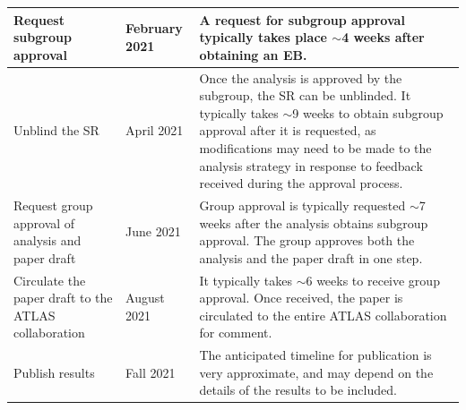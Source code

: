 \documentclass[12pt]{article}
\begin{document}
\begin{table}[H]
\begin{footnotesize}
\begin{tabular}{|p{30mm}|p{20mm}|p{100mm}|}
Request subgroup approval   & February 2021 &  A request for subgroup approval typically takes place $\sim$4 weeks after obtaining an EB.     \\ \hline
Unblind the SR  & April 2021 & Once the analysis is approved by the subgroup, the SR can be unblinded. It typically takes $\sim$9 weeks to obtain subgroup approval after it is requested, as modifications may need to be made to the analysis strategy in response to feedback received during the approval process.    \\ \hline
Request group approval of analysis and paper draft & June 2021 & Group approval is typically requested $\sim$7 weeks after the analysis obtains subgroup approval. The group approves both the analysis and the paper draft in one step.  \\ \hline
Circulate the paper draft to the ATLAS collaboration & August 2021 & It typically takes $\sim$6 weeks to receive group approval. Once received, the paper is circulated to the entire ATLAS collaboration for comment. \\ \hline
Publish results & Fall 2021 & The anticipated timeline for publication is very approximate, and may depend on the details of the results to be included.  \\ \hline
\end{tabular}
\end{footnotesize}
\end{table}



\end{document}
